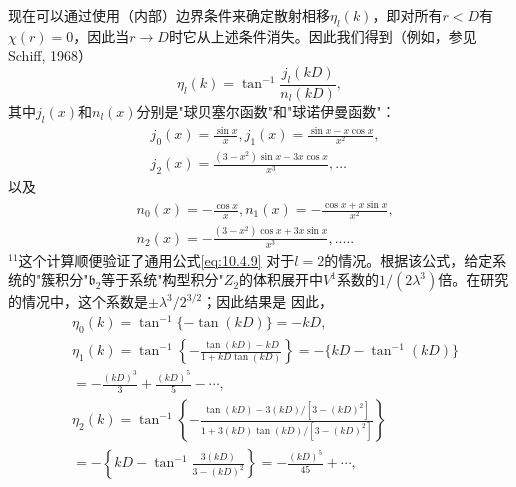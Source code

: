 现在可以通过使用（内部）边界条件来确定散射相移\(\eta_{l}(k)\)，即对所有\(r<D\)有\(\chi(r)=0\)，因此当\(r\rightarrow D\)时它从上述条件消失。因此我们得到（例如，参见Schiff, 1968）
\begin{equation}\tag{10.5.32}\label{eq:10.5.32}
\eta _ { l } ( k ) = \tan ^{- 1} \frac { j _ { l } ( k D ) } { n _ { l } ( k D ) } ,
\end{equation}
其中\(j_{l}(x)\)和\(n_{l}(x)\)分别是"球贝塞尔函数"和"球诺伊曼函数"：
\begin{equation}\tag{10.5.33}\label{eq:10.5.33}
\begin{array}{rl} & { j _ { 0 } ( x ) = \frac { \sin x } { x } ,  j _ { 1 } ( x ) = \frac { \sin x - x \cos x } { x ^{2} } , } \\& { j _ { 2 } ( x ) = \frac { ( 3 - x ^{2} ) \sin x - 3 x \cos x } { x ^{3} } , \ldots } \end{array}
\end{equation}
以及
\begin{equation}\tag{10.5.34}\label{eq:10.5.34}
\begin{array}{rl} & { n _ { 0 } ( x ) = - \frac { \cos x } { x } ,  n _ { 1 } ( x ) = - \frac { \cos x + x \sin x } { x ^{2} } , } \\& { n _ { 2 } ( x ) = - \frac { ( 3 - x ^{2} ) \cos x + 3 x \sin x } { x ^{3} } , . . . . . } \end{array}
\end{equation}
\(^{11}\)这个计算顺便验证了通用公式\autoref{eq:10.4.9} 对于\(l=2\)的情况。根据该公式，给定系统的"簇积分"\(\mathfrak{b}_2\)等于系统"构型积分"\(Z_2\)的体积展开中\(V^1\)系数的\(1/(2\lambda^3)\)倍。在研究的情况中，这个系数是\(\pm\lambda^3/2^{3/2}\)；因此结果是
因此，
\begin{equation}\tag{10.5.35}\label{eq:10.5.35}
\begin{array}{rl} & { \eta _ { 0 } ( k ) = \tan ^{- 1} \{ - \tan ( k D ) \} = - k D , } \\& { \eta _ { 1 } ( k ) = \tan ^{- 1} \left\{ - \frac { \tan ( k D ) - k D } { 1 + k D \tan ( k D ) } \right\} = - \{ k D - \tan ^{- 1} ( k D ) \} } \\& {  = - \frac { ( k D ) ^{3} } { 3 } + \frac { ( k D ) ^{5} } { 5 } - \cdots , } \\& { \eta _ { 2 } ( k ) = \tan ^{- 1} \left\{ - \frac { \tan ( k D ) - 3 ( k D ) / [ 3 - ( k D ) ^{2} ] } { 1 + 3 ( k D ) \tan ( k D ) / [ 3 - ( k D ) ^{2} ] } \right\} } \\& {  = - \left\{ k D - \tan ^{- 1} \frac { 3 ( k D ) } { 3 - ( k D ) ^{2} } \right\} = - \frac { ( k D ) ^{5} } { 45 } + \cdots , } \end{array}
\end{equation}

